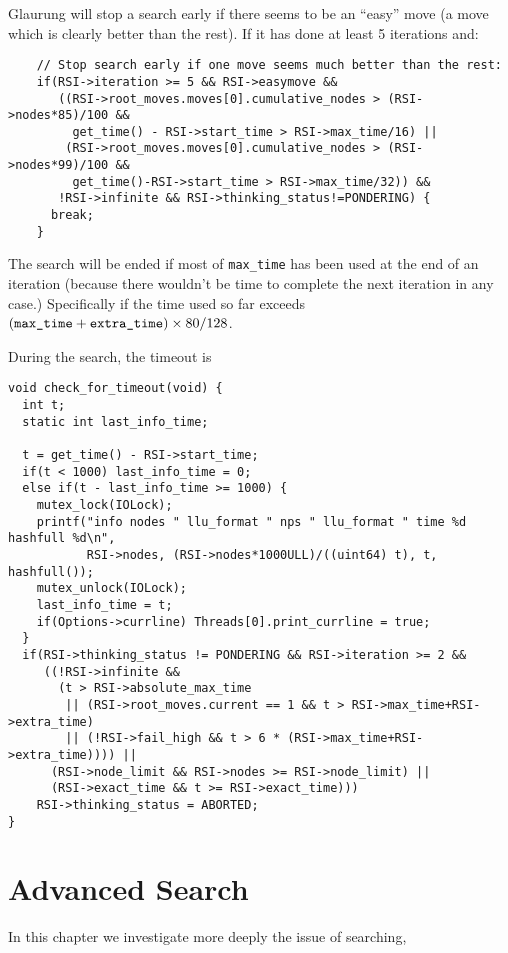 \documentclass[10pt,dvipdfmx]{report}
\let\x=\times
\begin{document}
Glaurung will stop a search early if there seems to be an ``easy'' move (a move
which is clearly better than the rest).  If it has done at least 5 iterations
and:
\begin{verbatim}
    // Stop search early if one move seems much better than the rest:
    if(RSI->iteration >= 5 && RSI->easymove &&
       ((RSI->root_moves.moves[0].cumulative_nodes > (RSI->nodes*85)/100 &&
         get_time() - RSI->start_time > RSI->max_time/16) ||
        (RSI->root_moves.moves[0].cumulative_nodes > (RSI->nodes*99)/100 && 
         get_time()-RSI->start_time > RSI->max_time/32)) &&
       !RSI->infinite && RSI->thinking_status!=PONDERING) {
      break;
    }
\end{verbatim}

The search will be ended if most of \verb|max_time| has been used at the end
of an iteration (because there wouldn't be time to complete the next iteration
in any case.)  Specifically if the time used so far exceeds
$(\verb|max_time| + \verb|extra_time|)\x80/128$.

During the search, the timeout is
\begin{verbatim}
void check_for_timeout(void) {
  int t;
  static int last_info_time;

  t = get_time() - RSI->start_time;
  if(t < 1000) last_info_time = 0;
  else if(t - last_info_time >= 1000) {
    mutex_lock(IOLock);
    printf("info nodes " llu_format " nps " llu_format " time %d hashfull %d\n",
           RSI->nodes, (RSI->nodes*1000ULL)/((uint64) t), t, hashfull());
    mutex_unlock(IOLock);
    last_info_time = t;
    if(Options->currline) Threads[0].print_currline = true;
  }
  if(RSI->thinking_status != PONDERING && RSI->iteration >= 2 &&
     ((!RSI->infinite && 
       (t > RSI->absolute_max_time
        || (RSI->root_moves.current == 1 && t > RSI->max_time+RSI->extra_time) 
        || (!RSI->fail_high && t > 6 * (RSI->max_time+RSI->extra_time)))) ||
      (RSI->node_limit && RSI->nodes >= RSI->node_limit) ||
      (RSI->exact_time && t >= RSI->exact_time)))
    RSI->thinking_status = ABORTED;
}
\end{verbatim}


\chapter{Advanced Search}
\label{chap-advanced-search}

In this chapter we investigate more deeply the issue of searching,
\end{document}
